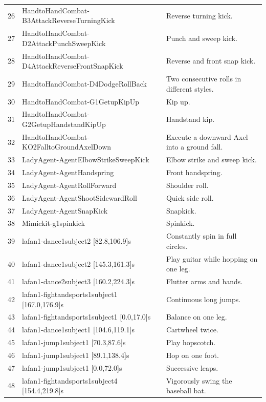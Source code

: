\begin{table}[htbp]
\begin{tabularx}{\textwidth}{llX}
    26 & HandtoHandCombat-B3AttackReverseTurningKick & Reverse turning kick. \\
    27 & HandtoHandCombat-D2AttackPunchSweepKick & Punch and sweep kick. \\
    28 & HandtoHandCombat-D4AttackReverseFrontSnapKick & Reverse and front snap kick. \\
    29 & HandtoHandCombat-D4DodgeRollBack & Two consecutive rolls in different styles. \\
    30 & HandtoHandCombat-G1GetupKipUp & Kip up. \\
    31 & HandtoHandCombat-G2GetupHandstandKipUp & Handstand kip. \\
    32 & HandtoHandCombat-KO2FalltoGroundAxelDown & Execute a downward Axel into a ground fall. \\
    33 & LadyAgent-AgentElbowStrikeSweepKick & Elbow strike and sweep kick. \\
    34 & LadyAgent-AgentHandspring & Front handspring. \\
    35 & LadyAgent-AgentRollForward & Shoulder roll. \\
    36 & LadyAgent-AgentShootSidewardRoll & Quick side roll. \\
    37 & LadyAgent-AgentSnapKick & Snapkick. \\
    38 & Mimickit-g1spinkick & Spinkick. \\
    39 & \ac{lafan1}-dance1subject2 [82.8,106.9]s & Constantly spin in full circles. \\
    40 & \ac{lafan1}-dance1subject2 [145.3,161.3]s & Play guitar while hopping on one leg. \\
    41 & \ac{lafan1}-dance2subject3 [160.2,224.3]s & Flutter arms and  hands. \\
    42 & \ac{lafan1}-fightandsports1subject1 [167.0,176.9]s & Continuous long jumps. \\
    43 & \ac{lafan1}-fightandsports1subject1 [0.0,17.0]s & Balance on one leg. \\
    44 & \ac{lafan1}-dance1subject1 [104.6,119.1]s & Cartwheel twice. \\
    45 & \ac{lafan1}-jump1subject1 [70.3,87.6]s & Play hopscotch. \\
    46 & \ac{lafan1}-jump1subject1 [89.1,138.4]s & Hop on one foot. \\
    47 & \ac{lafan1}-jump1subject1 [0.0,72.0]s & Successive leaps. \\
    48 & \ac{lafan1}-fightandsports1subject4 [154.4,219.8]s & Vigorously swing the baseball bat. \\

\end{tabularx}
\end{table}
